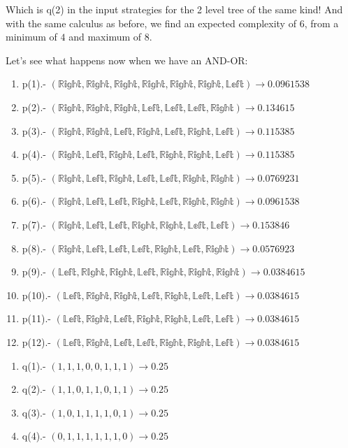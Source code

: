 \documentclass[a4paper,10pt]{article}
\begin{document}
Which is q(2) in the input strategies for the 2 level tree of the same kind! And with
the same calculus as before, we find an expected complexity of $6$, from a minimum
of $4$ and maximum of $8$.

Let's see what happens now when we have an AND-OR:

\begin{enumerate}
  \item p(1).- $(\mathbb{Right},\mathbb{Right},\mathbb{Right},\mathbb{Right},\mathbb{Right},\mathbb{Right},\mathbb{Left}) \to 0.0961538$
  \item p(2).- $(\mathbb{Right},\mathbb{Right},\mathbb{Right},\mathbb{Left},\mathbb{Left},\mathbb{Left},\mathbb{Right}) \to 0.134615$
  \item p(3).- $(\mathbb{Right},\mathbb{Right},\mathbb{Left},\mathbb{Right},\mathbb{Left},\mathbb{Right},\mathbb{Left}) \to 0.115385$
  \item p(4).- $(\mathbb{Right},\mathbb{Left},\mathbb{Right},\mathbb{Left},\mathbb{Right},\mathbb{Right},\mathbb{Left}) \to 0.115385$
  \item p(5).- $(\mathbb{Right},\mathbb{Left},\mathbb{Right},\mathbb{Left},\mathbb{Left},\mathbb{Right},\mathbb{Right}) \to 0.0769231$
  \item p(6).- $(\mathbb{Right},\mathbb{Left},\mathbb{Left},\mathbb{Right},\mathbb{Left},\mathbb{Right},\mathbb{Right}) \to 0.0961538$
  \item p(7).- $(\mathbb{Right},\mathbb{Left},\mathbb{Left},\mathbb{Right},\mathbb{Right},\mathbb{Left},\mathbb{Left}) \to 0.153846$
  \item p(8).- $(\mathbb{Right},\mathbb{Left},\mathbb{Left},\mathbb{Left},\mathbb{Right},\mathbb{Left},\mathbb{Right}) \to 0.0576923$
  \item p(9).- $(\mathbb{Left},\mathbb{RIght},\mathbb{Right},\mathbb{Left},\mathbb{Right},\mathbb{Right},\mathbb{Right}) \to 0.0384615$
  \item p(10).- $(\mathbb{Left},\mathbb{Right},\mathbb{Right},\mathbb{Left},\mathbb{Right},\mathbb{Left},\mathbb{Left}) \to 0.0384615$
  \item p(11).- $(\mathbb{Left},\mathbb{Right},\mathbb{Left},\mathbb{Right},\mathbb{Right},\mathbb{Left},\mathbb{Left}) \to 0.0384615$
  \item p(12).- $(\mathbb{Left},\mathbb{Right},\mathbb{Left},\mathbb{Left},\mathbb{Right},\mathbb{Right},\mathbb{Left}) \to 0.0384615$
\end{enumerate}

\begin{enumerate}
  \item q(1).- $(1,1,1,0,0,1,1,1) \to 0.25$
  \item q(2).- $(1,1,0,1,1,0,1,1) \to 0.25$
  \item q(3).- $(1,0,1,1,1,1,0,1) \to 0.25$
  \item q(4).- $(0,1,1,1,1,1,1,0) \to 0.25$
\end{enumerate}
\end{document}

